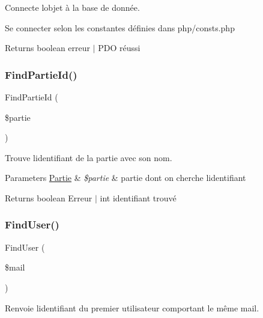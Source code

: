 Connecte l\textquotesingle{}objet à la base de donnée. 

Se connecter selon les constantes définies dans php/consts.\+php

\begin{DoxyReturn}{Returns}
boolean erreur $\vert$ P\+DO réussi 
\end{DoxyReturn}
\mbox{\label{class_interface_b_d_d_af667f486ba3dd4422cf48bad871f56e8}} 
\subsubsection{\texorpdfstring{Find\+Partie\+Id()}{FindPartieId()}}
{\footnotesize\ttfamily Find\+Partie\+Id (\begin{DoxyParamCaption}\item[{}]{\$partie }\end{DoxyParamCaption})}



Trouve l\textquotesingle{}identifiant de la partie avec son nom. 


\begin{DoxyParams}[1]{Parameters}
\mbox{\hyperlink{class_partie}{Partie}} & {\em \$partie} & partie dont on cherche l\textquotesingle{}identifiant\\
\hline
\end{DoxyParams}
\begin{DoxyReturn}{Returns}
boolean Erreur $\vert$ int identifiant trouvé 
\end{DoxyReturn}
\mbox{\label{class_interface_b_d_d_a8d979cbd1ec04e6ad7c3fed4d767e5a6}} 
\subsubsection{\texorpdfstring{Find\+User()}{FindUser()}}
{\footnotesize\ttfamily Find\+User (\begin{DoxyParamCaption}\item[{}]{\$mail }\end{DoxyParamCaption})}



Renvoie l\textquotesingle{}identifiant du premier utilisateur comportant le même mail. 


